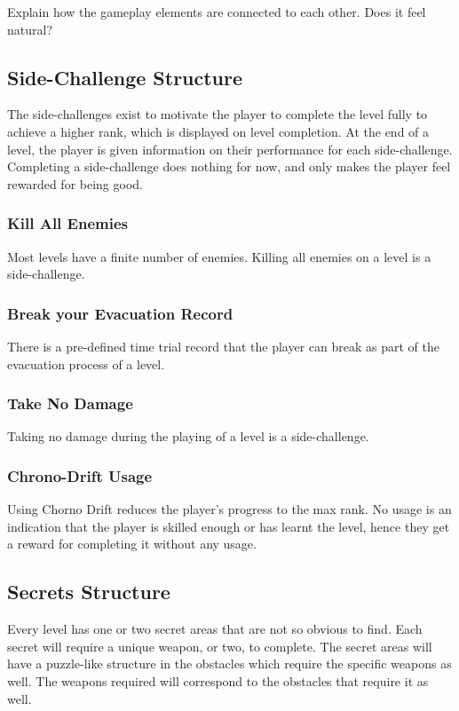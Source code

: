 \documentclass[12pt]{article}
\begin{document}
Explain how the gameplay elements are connected to each other. Does it feel natural?

\subsection{Side-Challenge Structure}

The side-challenges exist to motivate the player to complete the level fully to achieve a higher rank, which is displayed on level completion. At the end of a level, the player is given information on their performance for each side-challenge. Completing a side-challenge does nothing for now, and only makes the player feel rewarded for being good. 

\subsubsection{Kill All Enemies}

Most levels have a finite number of enemies. Killing all enemies on a level is a side-challenge.

\subsubsection{Break your Evacuation Record}

There is a pre-defined time trial record that the player can break as part of the evacuation process of a level. 

\subsubsection{Take No Damage}

Taking no damage during the playing of a level is a side-challenge. 

\subsubsection{Chrono-Drift Usage}

Using Chorno Drift reduces the player's progress to the max rank. No usage is an indication that the player is skilled enough or has learnt the level, hence they get a reward for completing it without any usage. 

\subsection{Secrets Structure}

Every level has one or two secret areas that are not so obvious to find. Each secret will require a unique weapon, or two, to complete. The secret areas will have a puzzle-like structure in the obstacles which require the specific weapons as well. The weapons required will correspond to the obstacles that require it as well. 
\end{document}
